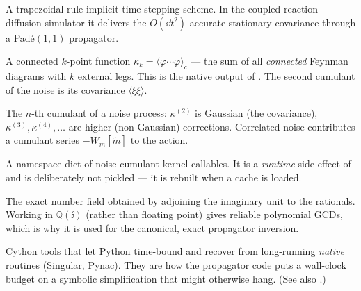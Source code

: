 \begin{description}[leftmargin=0pt,style=nextline]
  \item[Crank--Nicolson / semi-implicit] A trapezoidal-rule implicit time-stepping
        scheme. In the coupled reaction--diffusion simulator it delivers the
        $O(\dd t^{2})$-accurate stationary covariance through a Pad\'e$(1,1)$
        propagator.

  \item[Cumulant / connected correlation function] A connected $k$-point function
        $\kappa_k=\langle\varphi\cdots\varphi\rangle_c$ --- the sum of all
        \emph{connected} Feynman diagrams with $k$ external legs. This is the
        native output of . The second cumulant of the
        noise is its covariance $\langle\xi\xi\rangle$.

  \item[$\kappa^{(n)}$ (noise cumulant)] The $n$-th cumulant of a noise process:
        $\kappa^{(2)}$ is Gaussian (the covariance), $\kappa^{(3)},\kappa^{(4)},\dots$
        are higher (non-Gaussian) corrections. Correlated noise contributes a
        cumulant series $-W_m[\tilde m]$ to the action.

  \item[\code{\_cumulant\_kernels}] A namespace dict of noise-cumulant kernel
        callables. It is a \emph{runtime} side effect of
         and is deliberately not pickled --- it is
        rebuilt when a cache is loaded.

  \item[\code{CyclotomicField(4)} $=\mathbb{Q}(\ii)$] The exact number field
        obtained by adjoining the imaginary unit to the rationals. Working in
        $\mathbb{Q}(\ii)$ (rather than floating point) gives reliable polynomial
        GCDs, which is why it is used for the canonical, exact propagator
        inversion.

  \item[\code{cysignals} (\code{alarm} / \code{SignalError} / \code{AlarmInterrupt})]
        Cython tools that let Python time-bound and recover from long-running
        \emph{native} routines (Singular, Pynac). They are how the propagator code
        puts a wall-clock budget on a symbolic simplification that might otherwise
        hang. (See also .)

\end{description}

